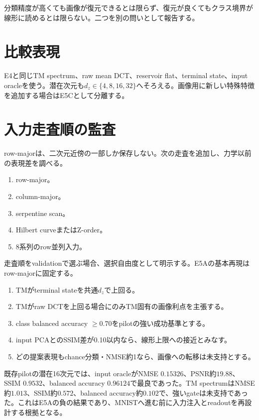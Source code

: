 \documentclass[a4paper,11pt,oneside,openany]{ltjsbook}
\begin{document}
\begin{cautionbox}
分類精度が高くても画像が復元できるとは限らず、復元が良くてもクラス境界が線形に読めるとは限らない。二つを別の問いとして報告する。
\end{cautionbox}

\section{比較表現}

E4と同じTM spectrum、raw mean DCT、reservoir flat、terminal state、input oracleを使う。潜在次元も\(d_z\in\{4,8,16,32\}\)へそろえる。画像用に新しい特殊特徴を追加する場合はE5Cとして分離する。

\section{入力走査順の監査}

row-majorは、二次元近傍の一部しか保存しない。次の走査を追加し、力学以前の表現差を調べる。

\begin{enumerate}
  \item row-major。
  \item column-major。
  \item serpentine scan。
  \item Hilbert curveまたはZ-order。
  \item 8系列のrow並列入力。
\end{enumerate}

走査順をvalidationで選ぶ場合、選択自由度として明示する。E5Aの基本再現はrow-majorに固定する。

\begin{gatebox}
\begin{enumerate}
  \item TMがterminal stateを共通\(d_z\)で上回る。
  \item TMがraw DCTを上回る場合にのみTM固有の画像利点を主張する。
  \item class balanced accuracy \(\ge0.70\)をpilotの強い成功基準とする。
  \item input PCAとのSSIM差が0.10以内なら、線形上限への接近とみなす。
  \item どの提案表現もchance分類・NMSE約1なら、画像への転移は未支持とする。
\end{enumerate}
\end{gatebox}

\begin{reportbox}
既存pilotの潜在16次元では、input oracleがNMSE \(0.15326\)、PSNR約\(19.88\)、SSIM \(0.9532\)、balanced accuracy \(0.96124\)で最良であった。TM spectrumはNMSE約\(1.013\)、SSIM約\(0.572\)、balanced accuracy約\(0.102\)で、強いgateは未支持であった。これはE5Aの負の結果であり、MNISTへ進む前に入力注入とreadoutを再設計する根拠となる。
\end{reportbox}
\end{document}
